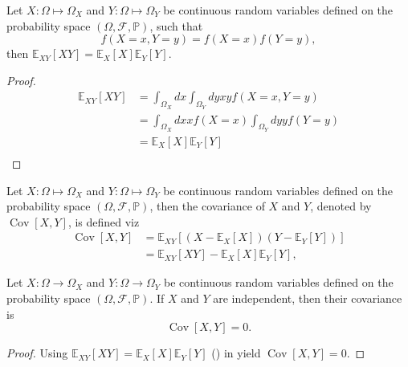 \begin{theorem}
	\label{theorem:expectation_independent}
	Let $X: \Omega \mapsto \Omega_X$ and $Y: \Omega \mapsto \Omega_Y$ be continuous random variables defined on the probability space $(\Omega, \mathcal{F}, \mathbb{P})$, such that
	\begin{equation}
	f(X=x,Y=y)=f(X=x)f(Y=y),	
	\end{equation}
	then $\mathbb{E}_{XY}[XY]=\mathbb{E}_X[X]\mathbb{E}_Y[Y]$.
\end{theorem}

\begin{proof}
	\begin{equation}
		\begin{split}
			\mathbb{E}_{XY}[XY] &= \int_{\Omega_X}dx\int_{\Omega_Y}dy x y f(X=x,Y=y)\\
			&= \int_{\Omega_X}dx x f(X=x)\int_{\Omega_Y}dy yf(Y=y)\\
			&= \mathbb{E}_X[X]\mathbb{E}_Y[Y]\\
		\end{split}
	\end{equation}
\end{proof}

\begin{definition}[Covariance]
	\label{def:covariance}
	Let $X: \Omega \mapsto \Omega_X$ and $Y: \Omega \mapsto \Omega_Y$ be continuous random variables defined on the probability space $(\Omega, \mathcal{F}, \mathbb{P})$, then the covariance of $X$ and $Y$, denoted by $\operatorname{Cov}[X,Y]$, is defined viz
	\begin{equation}
		\begin{split}
			\operatorname{Cov}[X,Y]&=\mathbb{E}_{XY}[(X-\mathbb{E}_X[X])(Y-\mathbb{E}_Y[Y])]\\
			&=\mathbb{E}_{XY}[XY]-\mathbb{E}_X[X]\mathbb{E}_Y[Y],
		\end{split}
	\end{equation}
\end{definition}
\begin{theorem}
	\label{theorem:covariance_of_independent_variables}
	Let $X: \Omega \to \Omega_X$ and $Y: \Omega \to \Omega_Y$ be continuous random variables defined on the probability space $(\Omega, \mathcal{F}, \mathbb{P})$. If $X$ and $Y$ are independent, then their covariance is
	\begin{equation}
		\operatorname{Cov}[X,Y] = 0.
	\end{equation}
	
\end{theorem}
\begin{proof}
	Using $\mathbb{E}_{XY}[XY]=\mathbb{E}_X[X]\mathbb{E}_Y[Y]$ () in  yield $\operatorname{Cov}[X,Y]=0$.
\end{proof}

